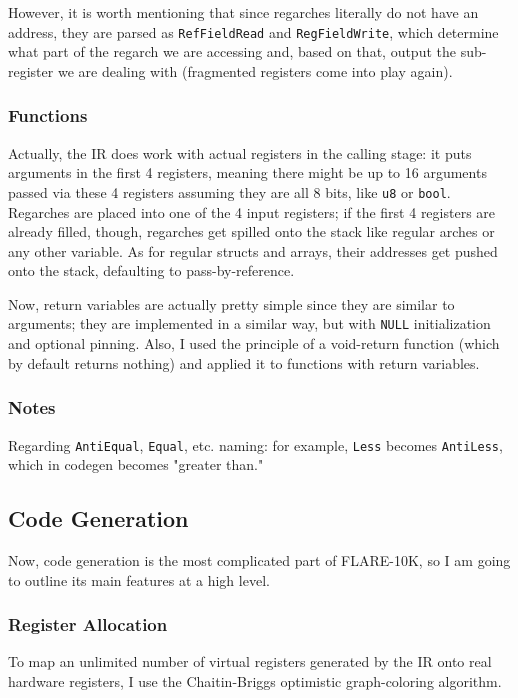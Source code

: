 \documentclass{article}
\begin{document}
However, it is worth mentioning that since regarches literally do not have an address, they are parsed as \texttt{RefFieldRead} and \texttt{RegFieldWrite}, which determine what part of the regarch we are accessing and, based on that, output the sub-register we are dealing with (fragmented registers come into play again).

\subsubsection{Functions}
Actually, the IR does work with actual registers in the calling stage: it puts arguments in the first 4 registers, meaning there might be up to 16 arguments passed via these 4 registers assuming they are all 8 bits, like \texttt{u8} or \texttt{bool}. Regarches are placed into one of the 4 input registers; if the first 4 registers are already filled, though, regarches get spilled onto the stack like regular arches or any other variable. As for regular structs and arrays, their addresses get pushed onto the stack, defaulting to pass-by-reference.

Now, return variables are actually pretty simple since they are similar to arguments; they are implemented in a similar way, but with \texttt{NULL} initialization and optional pinning. Also, I used the principle of a void-return function (which by default returns nothing) and applied it to functions with return variables.

\subsubsection{Notes}
Regarding \texttt{AntiEqual}, \texttt{Equal}, etc. naming: for example, \texttt{Less} becomes \texttt{AntiLess}, which in codegen becomes "greater than."

\subsection{Code Generation}
Now, code generation is the most complicated part of FLARE-10K, so I am going to outline its main features at a high level.

\subsubsection{Register Allocation}
To map an unlimited number of virtual registers generated by the IR onto real hardware registers, I use the Chaitin-Briggs optimistic graph-coloring algorithm.
\end{document}
